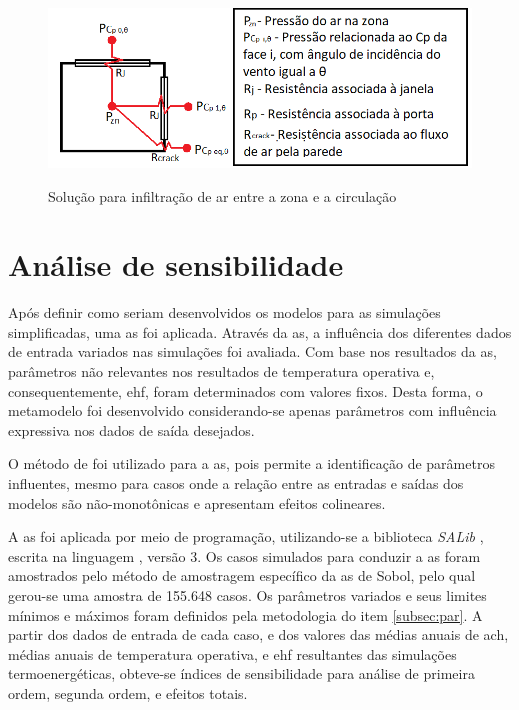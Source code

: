 \documentclass[brazil,hardcopy,openany]{ufscthesis} %
\begin{document}
\begin{figure}[H]
	\centering
	\caption{Solução para infiltração de ar entre a zona e a circulação}
	\includegraphics[width=.8\linewidth]{img/AFN_crack2.png}
	\label{fig:AFN_crack}
\end{figure}

\section{Análise de sensibilidade}

Após definir como seriam desenvolvidos os modelos para as simulações simplificadas, uma \acrfull{as} foi aplicada. Através da \acrshort{as}, a influência dos diferentes dados de entrada variados nas simulações foi avaliada. Com base nos resultados da \acrshort{as}, parâmetros não relevantes nos resultados de temperatura operativa e, consequentemente, \acrfull{ehf}, foram determinados com valores fixos. Desta forma, o metamodelo foi desenvolvido considerando-se apenas parâmetros com influência expressiva nos dados de saída desejados.

O método de  \cite{Sobol1993} foi utilizado para a \acrshort{as}, pois permite a identificação de parâmetros influentes, mesmo para casos onde a relação entre as entradas e saídas dos modelos são não-monotônicas e apresentam efeitos colineares.

A \acrshort{as} foi aplicada por meio de programação, utilizando-se a biblioteca \textit{SALib} \cite{Herman2017}, escrita na linguagem , versão 3.
Os casos simulados para conduzir a \acrshort{as} foram amostrados pelo método de amostragem específico da \acrshort{as} de Sobol, pelo qual gerou-se uma amostra de 155.648 casos.
Os parâmetros variados e seus limites mínimos e máximos foram definidos pela metodologia do item \ref{subsec:par}. 
A partir dos dados de entrada de cada caso, e dos valores das médias anuais de \acrshort{ach}, médias anuais de temperatura operativa, e \acrshort{ehf} resultantes das simulações termoenergéticas, obteve-se índices de sensibilidade para análise de primeira ordem, segunda ordem, e efeitos totais.
\newpage
\end{document}
